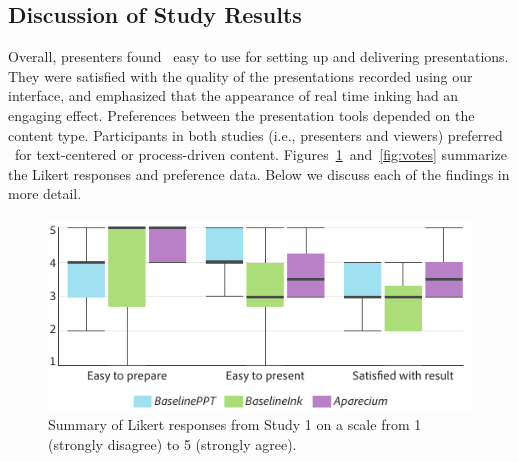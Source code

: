 \subsection{Discussion of Study Results}

Overall, presenters found \interface\ easy to use for setting up and delivering presentations. They were satisfied with the quality of the presentations recorded using our interface, and emphasized that the appearance of real time inking had an engaging effect. 
Preferences between the presentation tools depended on the content type. Participants in both studies (i.e., presenters and viewers) preferred \interface\ for text-centered or process-driven content. Figures~\ref{fig:likert}~and~\ref{fig:votes} summarize the Likert responses and preference data.
%
Below we discuss each of the findings in more detail. 

\begin{figure}[t!]
    \centering
        \includegraphics[width=1\columnwidth]{figures/study1likert}
        \caption{Summary of Likert responses from Study 1 on a scale from 1 (strongly disagree) to 5 (strongly agree).}
\label{fig:likert}
\end{figure}

